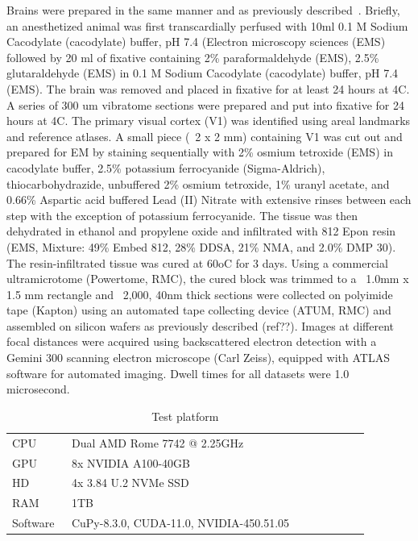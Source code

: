 \documentclass[sigconf,nonacm]{acmart}
\begin{document}
Brains were prepared in the same manner and as previously described~\cite{}.
Briefly, an anesthetized animal was first transcardially perfused with 10ml 0.1 M Sodium Cacodylate (cacodylate) buffer, pH 7.4 (Electron microscopy sciences (EMS) followed by 20 ml of fixative containing 2\% paraformaldehyde (EMS), 2.5\% glutaraldehyde (EMS) in 0.1 M Sodium Cacodylate (cacodylate) buffer, pH 7.4 (EMS).
The brain was removed and placed in fixative for at least 24 hours at 4C.
A series of 300 um vibratome sections were prepared and put into fixative for 24 hours at 4C.
The primary visual cortex (V1) was identified using areal landmarks and reference atlases.
A small piece (~2 x 2 mm) containing V1 was cut out and prepared for EM by staining sequentially with 2\% osmium tetroxide (EMS) in cacodylate buffer, 2.5\% potassium ferrocyanide (Sigma-Aldrich), thiocarbohydrazide, unbuffered 2\% osmium tetroxide, 1\% uranyl acetate, and 0.66\% Aspartic acid buffered Lead (II) Nitrate with extensive rinses between each step with the exception of potassium ferrocyanide.
The tissue was then dehydrated in ethanol and propylene oxide and infiltrated with 812 Epon resin (EMS, Mixture: 49\% Embed 812, 28\% DDSA, 21\% NMA, and 2.0\% DMP 30).
The resin-infiltrated tissue was cured at 60oC for 3 days.
Using a commercial ultramicrotome (Powertome, RMC), the cured block was trimmed to a ~1.0mm x 1.5 mm rectangle and ~2,000, 40nm thick sections were collected on polyimide tape (Kapton) using an automated tape collecting device (ATUM, RMC) and assembled on silicon wafers as previously described (ref??). Images at different focal distances were acquired using backscattered electron detection with a Gemini 300 scanning electron microscope (Carl Zeiss), equipped with ATLAS software for automated imaging. Dwell times for all datasets were 1.0 microsecond.

\begin{table}
    \caption{Test platform}

    \vspace{-2ex}

    \centering
    \begin{tabular}[t]{p{0.15\linewidth}p{0.75\linewidth}}
        \hline
        CPU      & Dual AMD Rome 7742 @ 2.25GHz            \\
        GPU      & 8x NVIDIA A100-40GB                     \\
        HD       & 4x 3.84 U.2 NVMe SSD                    \\
        RAM      & 1TB                                     \\
        Software & CuPy-8.3.0, CUDA-11.0, NVIDIA-450.51.05 \\
        \hline
    \end{tabular}
    \label{tab:test}
\end{table}
\end{document}

